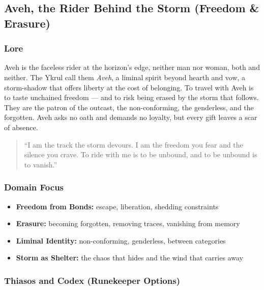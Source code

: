 
\subsection{Aveh, the Rider Behind the Storm (Freedom \& Erasure)}

\subsubsection*{Lore}
Aveh is the faceless rider at the horizon's edge, neither man nor woman, both and neither. The Ykrul call them \textit{Aveh}, a liminal spirit beyond hearth and vow, a storm-shadow that offers liberty at the cost of belonging. To travel with Aveh is to taste unchained freedom --- and to risk being erased by the storm that follows. They are the patron of the outcast, the non-conforming, the genderless, and the forgotten. Aveh asks no oath and demands no loyalty, but every gift leaves a scar of absence.

\begin{quote}
``I am the track the storm devours. I am the freedom you fear and the silence you crave. To ride with me is to be unbound, and to be unbound is to vanish.''
\end{quote}

\subsubsection*{Domain Focus}
\begin{itemize}
  \item \textbf{Freedom from Bonds:} escape, liberation, shedding constraints
  \item \textbf{Erasure:} becoming forgotten, removing traces, vanishing from memory
  \item \textbf{Liminal Identity:} non-conforming, genderless, between categories
  \item \textbf{Storm as Shelter:} the chaos that hides and the wind that carries away
\end{itemize}

\subsubsection*{Thiasos and Codex (Runekeeper Options)}

